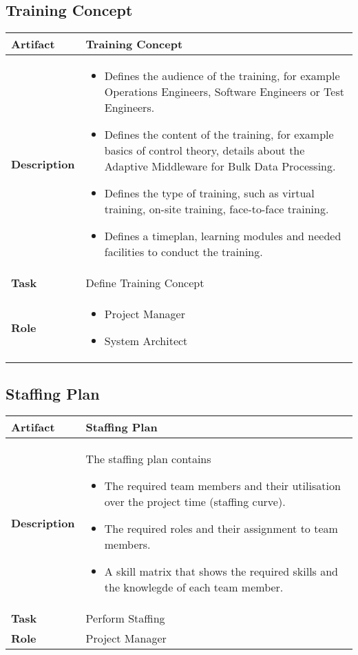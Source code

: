 \subsection{Training Concept}

\begin{tabularx}{\textwidth}{@{} l X @{}}
	\caption{Training Concept} \label{table:ch6_Artifact_Training_Concept}\\
	\toprule 
	\bfseries Artifact & Training Concept\\
	\midrule 
	\bfseries Description & 
	\begin{itemize}
		\item Defines the audience of the training, for example Operations Engineers, Software Engineers or Test Engineers.
		\item Defines the content of the training, for example basics of control theory, details about the Adaptive Middleware for Bulk Data Processing.
		\item Defines the type of training, such as virtual training, on-site training, face-to-face training. 
		\item Defines a timeplan, learning modules and needed facilities to conduct the training.
	\end{itemize}
	\\
	\midrule 
	\bfseries Task & Define Training Concept
	\\
	\midrule 
	\bfseries Role & 
	\begin{itemize}
		\item Project Manager
		\item System Architect
	\end{itemize}
	\\
	\bottomrule 
\end{tabularx}


\subsection{Staffing Plan}

\begin{tabularx}{\textwidth}{@{} l X @{}}
	\caption{Training Concept} \label{table:ch6_Artifact_Staffing_Plan}\\
	\toprule 
	\bfseries Artifact & Staffing Plan\\
	\midrule 
	\bfseries Description & The staffing plan contains
	\begin{itemize}
		\item The required team members and their utilisation over the project time (staffing curve).
		\item The required roles and their assignment to team members.
		\item A skill matrix that shows the required skills and the knowlegde of each team member.
	\end{itemize}
	\\
	\midrule 
	\bfseries Task & Perform Staffing
	\\
	\midrule 
	\bfseries Role & Project Manager\\
	\bottomrule 
\end{tabularx}


